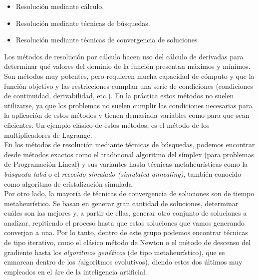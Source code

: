 \documentclass[a4paper, 12pt, oneside]{book}
\begin{document}
	\begin{itemize}
		\item Resoluci\'on mediante c\'alculo,
		\item Resoluci\'on mediante t\'ecnicas de b\'usquedas.
		\item Resoluci\'on mediante t\'ecnicas de convergencia de soluciones
	\end{itemize}
	
	Los m\'etodos de resoluci\'on por c\'alculo hacen uso del c\'alculo de derivadas para determinar qu\'e valores del dominio de la funci\'on presentan m\'aximos y m\'inimos. Son m\'etodos muy potentes, pero requieren mucha capacidad de c\'omputo y que la funci\'on objetivo y las restricciones cumplan una serie de condiciones (condiciones de continuidad, derivabilidad, etc.). En la pr\'actica estos m\'etodos no suelen utilizarse, ya que los problemas no suelen cumplir las condiciones necesarias para la aplicaci\'on de estos m\'etodos y tienen demasiada variables como para que sean eficientes. Un ejemplo cl\'asico de estos m\'etodos, es el m\'etodo de los multiplicadores de Lagrange.
	\\
	
	En los m\'etodos de resoluci\'on mediante t\'ecnicas de b\'usquedas, podemos encontrar desde m\'etodos exactos como el tradicional algoritmo del s\'implex (para problemas de Programaci\'on Lineal) y sus variantes hasta t\'ecnicas metaheur\'isticas como la \textit{b\'usqueda tab\'u} o el \textit{recocido simulado (simulated annealing)}, tambi\'en conocido como algoritmo de cristalizaci\'on simulada.
	\\
	
	Por otro lado, la mayor\'ia de t\'ecnicas de convergencia de soluciones son de tiempo metaheur\'istico. Se basan en generar gran cantidad de soluciones, determinar cu\'ales son las mejores y, a partir de ellas, generar otro conjunto de soluciones a analizar, repitiendo el proceso hasta que estas soluciones que vamos generando converjan a una. Por lo tanto, dentro de este grupo podemos encontrar t\'ecnicas de tipo iterativo, como el cl\'asico m\'etodo de Newton o el m\'etodo de descenso del gradiente hasta los \textit{algoritmos gen\'eticos} (de tipo metaheur\'istico), que se enmarcan dentro de los \textit(algoritmos evolutivos), diendo estos dos \'ultimos muy empleados en el \'are de la inteligencia artificial.
	\\
	
\end{document}
